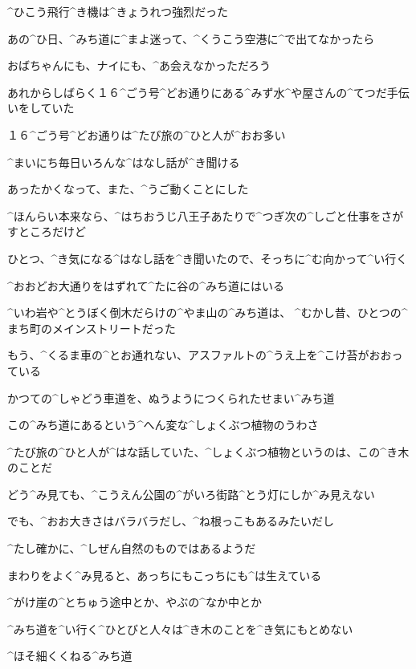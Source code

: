 \page[78]
\A ^{ひこう}{飛行}^{き}{機}は^{きょうれつ}{強烈}だった

\A あの^{ひ}{日}、^{みち}{道}に^{まよ}{迷}って、^{くうこう}{空港}に^{で}{出}てなかったら

\A おばちゃんにも、ナイにも、^{あ}{会}えなかっただろう

\page
\A あれからしばらく１６^{ごう}{号}^{どお}{通}りにある^{みず}{水}^{や}{屋}さんの^{てつだ}{手伝}いをしていた

\A １６^{ごう}{号}^{どお}{通}りは^{たび}{旅}の^{ひと}{人}が^{おお}{多}い

\A ^{まいにち}{毎日}いろんな^{はなし}{話}が^{き}{聞}ける

\A あったかくなって、また、^{うご}{動}くことにした

\A ^{ほんらい}{本来}なら、^{はちおうじ}{八王子}あたりで^{つぎ}{次}の^{しごと}{仕事}をさがすところだけど

\A ひとつ、^{き}{気}になる^{はなし}{話}を^{き}{聞}いたので、そっちに^{む}{向}かって^{い}{行}く

\page
\A ^{おおどお}{大通}りをはずれて^{たに}{谷}の^{みち}{道}にはいる

\A ^{いわ}{岩}や^{とうぼく}{倒木}だらけの^{やま}{山}の^{みち}{道}は、
^{むかし}{昔}、ひとつの^{まち}{町}のメインストリートだった

\A もう、^{くるま}{車}の^{とお}{通}れない、アスファルトの^{うえ}{上}を^{こけ}{苔}がおおっている

\page
\A かつての^{しゃどう}{車道}を、ぬうようにつくられたせまい^{みち}{道}

\A この^{みち}{道}にあるという^{へん}{変}な^{しょくぶつ}{植物}のうわさ

\A ^{たび}{旅}の^{ひと}{人}が^{はな}{話}していた、^{しょくぶつ}{植物}というのは、この^{き}{木}のことだ

\page
\A どう^{み}{見}ても、^{こうえん}{公園}の^{がいろ}{街路}^{とう}{灯}にしか^{み}{見}えない

\A でも、^{おお}{大}きさはバラバラだし、^{ね}{根}っこもあるみたいだし

\A ^{たし}{確}かに、^{しぜん}{自然}のものではあるようだ

\page
\A まわりをよく^{み}{見}ると、あっちにもこっちにも^{は}{生}えている

\A ^{がけ}{崖}の^{とちゅう}{途中}とか、やぶの^{なか}{中}とか

\A ^{みち}{道}を^{い}{行}く^{ひとびと}{人々}は^{き}{木}のことを^{き}{気}にもとめない

\A ^{ほそ}{細}くくねる^{みち}{道}


